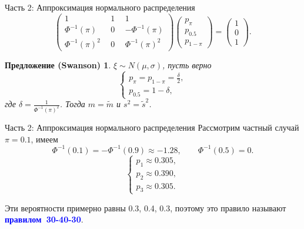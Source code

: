 \documentclass[ucs, notheorems, handout]{beamer}
\newtheorem{proposition}[theorem]{Предложение (Swanson)}
\begin{document}
	\begin{frame}{Часть 2: Аппроксимация нормального распределения}
		\begin{equation*}
			\begin{pmatrix} 1&1&1\\ 
				\Phi^{-1}(\pi)~~ &  0~~  & -\Phi ^{-1}(\pi) \\ 
				\Phi ^{-1}(\pi)^{2}~~& 0~~  &\Phi ^{-1}(\pi)^{2}
			\end{pmatrix} 
			\begin{pmatrix}p_{\pi}\\p_{0.5}\\ p_{1-\pi}\end{pmatrix}= \begin{pmatrix}1\\0\\1\end{pmatrix}.
		\end{equation*}
		
		\begin{proposition}\label{pr7}
			$\xi\sim N(\mu, \sigma)$, пусть верно 
			\begin{equation*}
				\begin{cases}
					p_{\pi} = p_{1-\pi}=\displaystyle{\frac{\delta}{2}},\\ 
					p_{0.5}=1-\delta,
				\end{cases}\label{7}
			\end{equation*}
			где $\delta  = \displaystyle{\frac{1}{\Phi ^{-1}(\pi)^{2}}}$. Тогда $m=\tilde{m}$ и $s^{2} = \tilde{s}^{2}$.
		\end{proposition}
		
	\end{frame}
	
	\begin{frame}{Часть 2: Аппроксимация нормального распределения}
		Рассмотрим частный случай $\pi = 0.1$, имеем 
		$$\Phi ^{-1}(0.1) = -\Phi ^{-1}(0.9) \approx  -1.28, \qquad \Phi ^{-1}(0.5) = 0. $$
		\begin{equation*}
			\begin{cases}
				p_{1}\approx 0.305, \\ 
				p_{2}\approx 0.390,  \\ 
				p_{3}\approx 0.305.
			\end{cases}
		\end{equation*}
		
		Эти вероятности примерно равны 0.3, 0.4, 0.3, поэтому это правило называют \textcolor{blue}{\hbox{\textbf{правилом 30-40-30}}}.
		
		
	\end{frame}	
	
\end{document}

